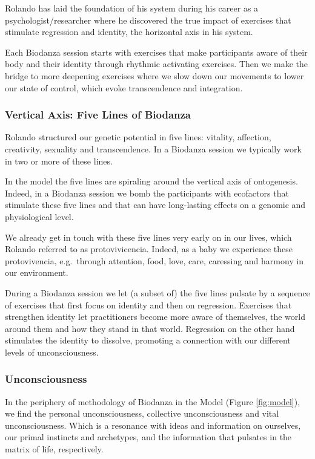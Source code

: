 \documentclass[
  11pt,
]{book}
\begin{document}
Rolando has laid the foundation of his system during his career as a psychologist/researcher where he discovered the true impact of exercises that stimulate regression and identity, the horizontal axis in his system.

Each Biodanza session starts with exercises that make participants aware of their body and their identity through rhythmic activating exercises.
Then we make the bridge to more deepening exercises where we slow down our movements to lower our state of control, which evoke transcendence and integration.

\hypertarget{vertical-axis-five-lines-of-biodanza}{%
\subsubsection{Vertical Axis: Five Lines of Biodanza}\label{vertical-axis-five-lines-of-biodanza}}

Rolando structured our genetic potential in five lines: vitality, affection, creativity, sexuality and transcendence.
In a Biodanza session we typically work in two or more of these lines.

In the model the five lines are spiraling around the vertical axis of ontogenesis. Indeed, in a Biodanza session we bomb the participants with ecofactors that stimulate these five lines and that can have long-lasting effects on a genomic and physiological level.

We already get in touch with these five lines very early on in our lives, which Rolando referred to as protovivicencia. Indeed, as a baby we experience these protovivencia, e.g.~through attention, food, love, care, caressing and harmony in our environment.

During a Biodanza session we let (a subset of) the five lines pulsate by a sequence of exercises that first focus on identity and then on regression.
Exercises that strengthen identity let practitioners become more aware of themselves, the world around them and how they stand in that world. Regression on the other hand stimulates the identity to dissolve, promoting a connection with our different levels of unconsciousness.

\hypertarget{unconsciousness}{%
\subsubsection{Unconsciousness}\label{unconsciousness}}

In the periphery of methodology of Biodanza in the Model (Figure \ref{fig:model}), we find the personal unconsciousness, collective unconsciousness and vital unconsciousness.
Which is a resonance with ideas and information on ourselves, our primal instincts and archetypes, and the information that pulsates in the matrix of life, respectively.
\end{document}
